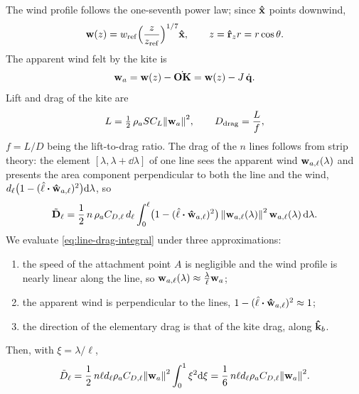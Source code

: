 \documentclass[10pt, a4paper]{article}
\begin{document}
The wind profile follows the one-seventh power law; since $\vu x$ points
downwind,
\begin{equation} \label{eq:wind}
    \vb w(z) = w_{\mathrm{ref}}
    \Bigl( \frac{z}{z_{\mathrm{ref}}} \Bigr)^{1/7} \vu x,
    \qquad
    z = \vu r_z r = r\cos\theta.
\end{equation}
The apparent wind felt by the kite is
\begin{equation} \label{eq:apparent-wind}
    \vb w_a = \vb w(z) - \dot{\vb{OK}}
    = \vb w(z) - J\,\dot{\vb q}.
\end{equation}
Lift and drag of the kite are
\begin{equation} \label{eq:lift-drag}
    L = \tfrac{1}{2}\,\rho_a S C_L \norm{\vb w_a}^2,
    \qquad
    D_{\mathrm{drag}} = \frac{L}{f},
\end{equation}
$f = L/D$ being the lift-to-drag ratio.  The drag of the $n$ lines follows
from strip theory: the element $[\lambda, \lambda + \dd\lambda]$ of one
line sees the apparent wind $\vb w_{a,\ell}(\lambda)$ and presents the
area component perpendicular to both the line and the wind,
$d_\ell \bigl(1 - (\lhat \vdot \vu w_{a,\ell})^2\bigr) \dd\lambda$, so
\begin{equation} \label{eq:line-drag-integral}
    \tilde{\vb D}_\ell
    = \frac{1}{2}\, n \, \rho_a C_{D,\ell} \, d_\ell
    \int_0^\ell
    \bigl(1 - (\lhat \vdot \vu w_{a,\ell})^2\bigr)\,
    \norm{\vb w_{a,\ell}(\lambda)}^2\,
    \vb w_{a,\ell}(\lambda)\, \dd\lambda.
\end{equation}
We evaluate \eqref{eq:line-drag-integral} under three approximations:
\begin{enumerate}
    \item the speed of the attachment point $A$ is negligible and the
    wind profile is nearly linear along the line, so
    $\vb w_{a,\ell}(\lambda) \approx \tfrac{\lambda}{\ell} \vb w_a$;
    \item the apparent wind is perpendicular to the lines,
    $1 - (\lhat \vdot \vu w_{a,\ell})^2 \approx 1$;
    \item the direction of the elementary drag is that of the kite drag,
    along $\vu k_b$.
\end{enumerate}
Then, with $\xi = \lambda/\ell$,
\begin{equation}
    \tilde D_\ell
    = \frac{1}{2}\, n \ell d_\ell \rho_a C_{D,\ell}
    \norm{\vb w_a}^2 \int_0^1 \xi^2 \dd\xi
    = \frac{1}{6}\, n \ell d_\ell \rho_a C_{D,\ell}
    \norm{\vb w_a}^2.
\end{equation}
\end{document}
